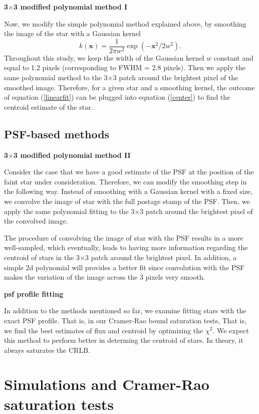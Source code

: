 \documentclass[12pt, preprint]{aastex}
\newcommand{\beq}{\begin{equation}}
\newcommand{\eeq}{\end{equation}}
\begin{document}
\item {\bf 3$\times$3 modified polynomial method I}\quad

Now, we modify the simple polynomial method explained above,
by smoothing the image of the star with a Gaussian kernel
\beq
k(\mathbf{x}) = \frac{1}{2\pi w^2}\exp(-\mathbf{x}^{2}/2w^{2}).
\eeq
Throughout this study, we keep the width of the Gaussian kernel $w$ constant and equal to
1.2 pixels (corresponding to FWHM = 2.8 pixels).
Then we apply the same polynomial method to the 3$\times$3 patch around the brightest
pixel of the smoothed image. Therefore, for a given star and a smoothing kernel,
the outcome of equation (\ref{linearfit}) can be
plugged into equation (\ref{center}) to find the centroid estimate
of the star. 

\subsection{PSF-based methods}

\item {\bf 3$\times$3 modified polynomial method II}\quad

Consider the case that we have a good estimate of the PSF at
the position of the faint star under consideration. Therefore, we 
can modify the smoothing step in the following way. Instead of smoothing
with a Gaussian kernel with a fixed size, we convolve the image of star
with the full postage stamp of the PSF. Then, we apply the same polynomial
fitting to the 3$\times$3 patch around the brightest pixel of the convolved image.

The procedure of convolving the image of star with the PSF results in a
more well-sampled, which eventually, leads to having more
information regarding the centroid of stars in the 3$\times$3 patch around the
brightest pixel. In addition, a simple 2d polynomial will provides a better fit 
since convolution with the PSF makes the variation of the image across the 3 pixels
very smooth.

\item {\bf psf profile fitting}\quad

In addition to the methods mentioned so far, we examine fitting stars with the exact
 PSF profile. That is, in our Cramer-Rao bound saturation tests, That is, we find the best
 estimates of flux and centroid by
optimizing the $\chi^{2}$. We expect this method to perform better in determing the centroid
 of stars. In theory, it always saturates the CRLB. 
 
\section{Simulations and Cramer-Rao saturation tests}\label{sec:data}
\end{document}
